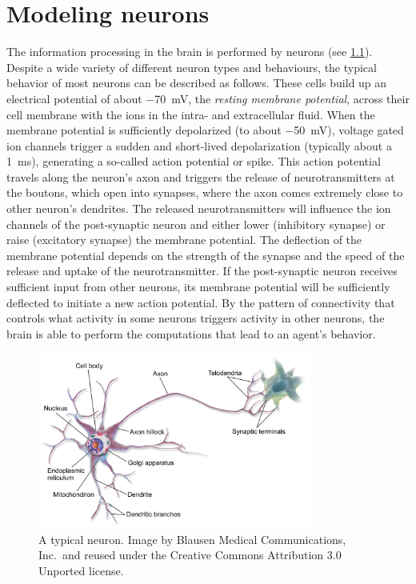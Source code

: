 \chapter{Modeling neurons}\label{sec:neurons}
The information processing in the brain is performed by neurons (see \cref{fig:neuron}).
Despite a wide variety of different neuron types and behaviours, the typical behavior of most neurons can be described as follows.
These cells build up an electrical potential of about \SI{-70}{\milli\volt}, the \emph{resting membrane potential}, across their cell membrane with the ions in the intra- and extracellular fluid.
When the membrane potential is sufficiently depolarized (to about \SI{-50}{\milli\volt}), voltage gated ion channels trigger a sudden and short-lived depolarization (typically about a \SI{1}{\milli\second}), generating a so-called action potential or spike.
This action potential travels along the neuron's axon and triggers the release of neurotransmitters at the boutons, which open into synapses, where the axon comes extremely close to other neuron's dendrites.
The released neurotransmitters will influence the ion channels of the post-synaptic neuron and either lower (inhibitory synapse) or raise (excitatory synapse) the membrane potential.
The deflection of the membrane potential depends on the strength of the synapse and the speed of the release and uptake of the neurotransmitter.
If the post-synaptic neuron receives sufficient input from other neurons, its membrane potential will be sufficiently deflected to initiate a new action potential.
By the pattern of connectivity that controls what activity in some neurons triggers activity in other neurons, the brain is able to perform the computations that lead to an agent's behavior.

\begin{figure}
    \centering
    \includegraphics[width=0.8\textwidth]{figures/Blausen_0657_MultipolarNeuron}
    \caption[A typical neuron]{A typical neuron. Image by Blausen Medical Communications, Inc.\ and reused under the Creative Commons Attribution 3.0 Unported license.}\label{fig:neuron}
\end{figure}


